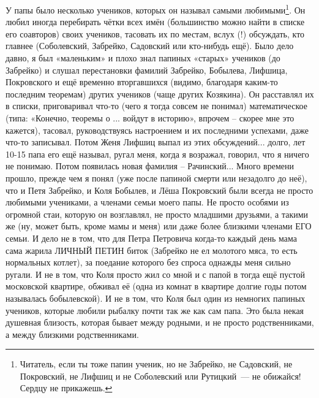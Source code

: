 У папы было несколько учеников, которых он называл самыми любимыми\footnote{Читатель, если ты тоже папин ученик, но не Забрейко, не Садовский, не Покровский, не Лифшиц и не Соболевский или Рутицкий~--- не обижайся! Сердцу не прикажешь.}. Он любил иногда перебирать чётки всех имён (большинство можно найти в списке его соавторов) своих учеников, тасовать их по местам, вслух (!) обсуждать, кто главнее (Соболевский, Забрейко, Садовский или кто-нибудь ещё). Было дело давно, я был «маленьким» и плохо знал папиных «старых» учеников (до Забрейко) и слушал перестановки фамилий Забрейко, Бобылева, Лифшица, Покровского и ещё временно вторгавшихся (видимо, благодаря каким-то последним теоремам) других учеников (чаще других Козякина). Он расставлял их в списки, приговаривал что-то (чего я тогда совсем не понимал) математическое (типа: «Конечно, теоремы о ... войдут в историю», впрочем – скорее мне это кажется), тасовал, руководствуясь настроением и их последними успехами, даже что-то записывал. Потом Женя Лифшиц выпал из этих обсуждений... долго, лет 10-15 папа его ещё называл, ругал меня, когда я возражал, говорил, что я ничего не понимаю. Потом появилась новая фамилия – Рачинский... Много времени прошло,  прежде  чем  я  понял  (уже после папиной смерти или незадолго до неё), что и Петя Забрейко, и Коля Бобылев, и Лёша Покровский были всегда не просто любимыми учениками, а членами семьи моего папы. Не просто особями из огромной стаи, которую он возглавлял, не просто младшими друзьями, а такими же (ну, может быть, кроме мамы и меня) или даже более близкими членами ЕГО семьи. И дело не в том, что для Петра Петровича когда-то каждый день мама сама жарила ЛИЧНЫЙ ПЕТИН биток (Забрейко не ел молотого мяса, то есть нормальных котлет), за поедание которого без спроса однажды меня сильно ругали. И не в том, что Коля просто жил со мной и с папой в тогда ещё пустой московской квартире, обживал её (одна из комнат в квартире долгие годы потом называлась бобылевской). И не в том, что Коля был один из немногих папиных учеников, которые любили рыбалку почти так же как сам папа. Это была некая душевная близость, которая бывает между родными, и не просто родственниками, а между близкими родственниками.

